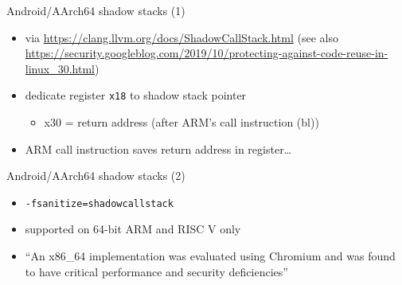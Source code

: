 \begin{frame}[fragile,label=actShadowStack]{Android/AArch64 shadow stacks (1)}
   \begin{itemize}
    \item \tiny via \url{https://clang.llvm.org/docs/ShadowCallStack.html} (see also {\url{https://security.googleblog.com/2019/10/protecting-against-code-reuse-in-linux_30.html}})
    \item dedicate register \texttt{x18} to shadow stack pointer
        \begin{itemize}
        \item x30 = return address (after ARM's call instruction (bl))
        \end{itemize}
    \item ARM call instruction saves return address in register\ldots
    \end{itemize}
\end{frame}

\begin{frame}{Android/AArch64 shadow stacks (2)}
    \begin{itemize}
    \item \texttt{-fsanitize=shadowcallstack}
    \item supported on 64-bit ARM and RISC V only
    \vspace{.5cm}
    \item ``An x86\_64 implementation was evaluated using Chromium and was found to have critical performance and security deficiencies''
    \end{itemize}
\end{frame}
